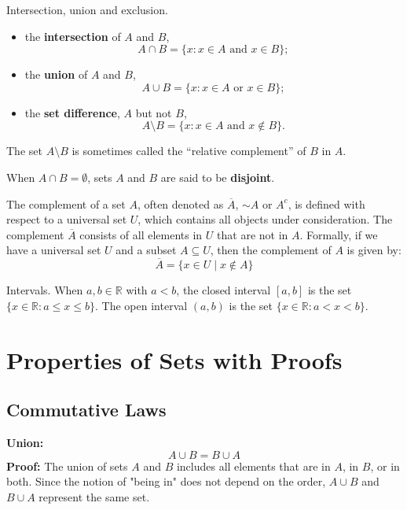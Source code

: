 \begin{definition}
Intersection, union and exclusion.
 \begin{itemize}
  \item the \textbf{intersection} of \( A \) and \( B \),
  \[ A \cap B = \{x : x \in A \text{ and } x \in B\}; \]
  \item the \textbf{union} of \( A \) and \( B \),
  \[ A \cup B = \{x : x \in A \text{ or } x \in B\}; \]
  \item the \textbf{set difference}, \( A \) but not \( B \),
  \[ A \setminus B = \{x : x \in A \text{ and } x \notin B\}. \]

\end{itemize}

The set \( A \setminus B \) is sometimes called the ``relative complement'' of \( B \) in \( A \).

When \( A \cap B = \emptyset \), sets \( A \) and \( B \) are said to be \textbf{disjoint}.
\end{definition}

\begin{definition}
The complement of a set \( A \), often denoted as \( \overline{A} \), $\sim A$ or \( A^c \), is defined with respect to a universal set \( U \), which contains all objects under consideration. The complement \( \overline{A} \) consists of all elements in \( U \) that are not in \( A \). Formally, if we have a universal set \( U \) and a subset \( A \subseteq U \), then the complement of \( A \) is given by:
\[ \overline{A} = \{ x \in U \mid x \notin A \} \]


\end{definition}
\begin{definition}[Intervals]
Intervals. When \( a, b \in \mathbb{R} \) with \( a < b \), the closed interval \( [a, b] \) is the set \( \{x \in \mathbb{R} : a \leq x \leq b\} \). The open interval \( (a, b) \) is the set \( \{x \in \mathbb{R} : a < x < b\} \).
\end{definition}


\section{Properties of Sets with Proofs}

\subsection*{Commutative Laws}
\textbf{Union:}
\[
A \cup B = B \cup A
\]
\textbf{Proof:} 
The union of sets \( A \) and \( B \) includes all elements that are in \( A \), in \( B \), or in both. Since the notion of "being in" does not depend on the order, \( A \cup B \) and \( B \cup A \) represent the same set.

